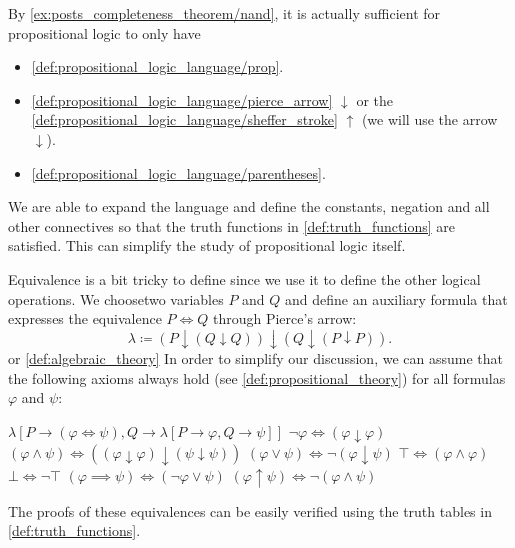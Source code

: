 \begin{remark}\label{remark:minimal_propositional_language}
  By \cref{ex:posts_completeness_theorem/nand}, it is actually sufficient for propositional logic to only have
  \begin{itemize}
    \item \ref{def:propositional_logic_language/prop}.
    \item \ref{def:propositional_logic_language/pierce_arrow} \( \downarrow \) or the \ref{def:propositional_logic_language/sheffer_stroke} \( \uparrow \) (we will use the arrow \( \downarrow \)).
    \item \ref{def:propositional_logic_language/parentheses}.
  \end{itemize}

  We are able to expand the language and define the constants, negation and all other connectives so that the truth functions in \cref{def:truth_functions} are satisfied. This can simplify the study of propositional logic itself.

  Equivalence is a bit tricky to define since we use it to define the other logical operations. We choose\AOC two variables \( P \) and \( Q \) and define an auxiliary formula that expresses the equivalence \( P \iff Q \) through Pierce's arrow:
  \begin{equation*}
    \lambda \coloneqq (P \downarrow (Q \downarrow Q)) \downarrow (Q \downarrow (P \downarrow P)).
  \end{equation*}
 or \cref{def:algebraic_theory}
  In order to simplify our discussion, we can assume that the following axioms always hold (see \cref{def:propositional_theory}) for all formulas \( \varphi \) and \( \psi \):
  \begin{description}
     \( \lambda[P \to (\varphi \iff \psi), Q \to \lambda[P \to \varphi, Q \to \psi]] \)
     \( \neg \varphi \iff (\varphi \downarrow \varphi) \)
     \( (\varphi \land \psi) \iff ((\varphi \downarrow \varphi) \downarrow (\psi \downarrow \psi)) \)
     \( (\varphi \lor \psi) \iff \neg (\varphi \downarrow \psi) \)
     \( \top \iff (\varphi \land \varphi) \)
     \( \bot \iff \neg \top \)
     \( (\varphi \implies \psi) \iff (\neg \varphi \lor \psi) \)
     \( (\varphi \uparrow \psi) \iff \neg (\varphi \land \psi) \)
  \end{description}

  The proofs of these equivalences can be easily verified using the truth tables in \cref{def:truth_functions}.
\end{remark}

